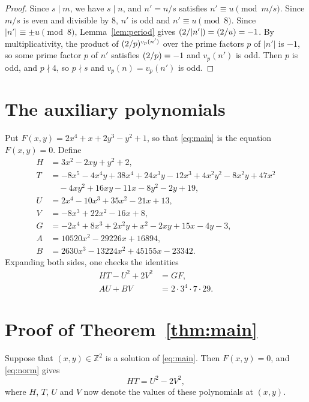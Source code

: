 \documentclass[11pt]{article}
\newcommand{\Z}{\mathbb{Z}}
\newcommand{\leg}[2]{\mathchoice{\biggl(\dfrac{#1}{#2}\biggr)}{(#1/#2)}{(#1/#2)}{(#1/#2)}}
\begin{document}
\begin{proof}
Since $s\mid m$, we have $s\mid n$, and $n'=n/s$ satisfies $n'\equiv u\pmod{m/s}$. Since $m/s$ is even and divisible by $8$, $n'$ is odd and $n'\equiv u\pmod{8}$. Since $|n'|\equiv\pm u\pmod{8}$, Lemma~\ref{lem:period} gives $\leg{2}{|n'|}=\leg{2}{u}=-1$. By multiplicativity, the product of $\leg{2}{p}^{v_p(n')}$ over the prime factors $p$ of $|n'|$ is $-1$, so some prime factor $p$ of $n'$ satisfies $\leg{2}{p}=-1$ and $v_p(n')$ is odd. Then $p$ is odd, and $p\nmid4$, so $p\nmid s$ and $v_p(n)=v_p(n')$ is odd.
\end{proof}

\section{The auxiliary polynomials}

Put $F(x,y)=2x^{4}+x+2y^{3}-y^{2}+1$, so that \eqref{eq:main} is the equation $F(x,y)=0$. Define
\begin{align*}
H&=3x^{2}-2xy+y^{2}+2,\\
T&=-8x^{5}-4x^{4}y+38x^{4}+24x^{3}y-12x^{3}+4x^{2}y^{2}-8x^{2}y+47x^{2}\\
&\quad-4xy^{2}+16xy-11x-8y^{2}-2y+19,\\
U&=2x^{4}-10x^{3}+35x^{2}-21x+13,\\
V&=-8x^{3}+22x^{2}-16x+8,\\
G&=-2x^{4}+8x^{3}+2x^{2}y+x^{2}-2xy+15x-4y-3,\\
A&=10520x^{2}-29226x+16894,\\
B&=2630x^{3}-13224x^{2}+45155x-23342.
\end{align*}
Expanding both sides, one checks the identities
\begin{align}
HT-U^2+2V^2&=GF,\label{eq:norm}\\
AU+BV&=2\cdot 3^{4}\cdot 7\cdot 29.\label{eq:bezout}
\end{align}

\section{Proof of Theorem~\ref{thm:main}}

Suppose that $(x,y)\in\Z^2$ is a solution of \eqref{eq:main}. Then $F(x,y)=0$, and \eqref{eq:norm} gives
\begin{equation}\label{eq:HT}
HT=U^2-2V^2,
\end{equation}
where $H$, $T$, $U$ and $V$ now denote the values of these polynomials at $(x,y)$.
\end{document}
